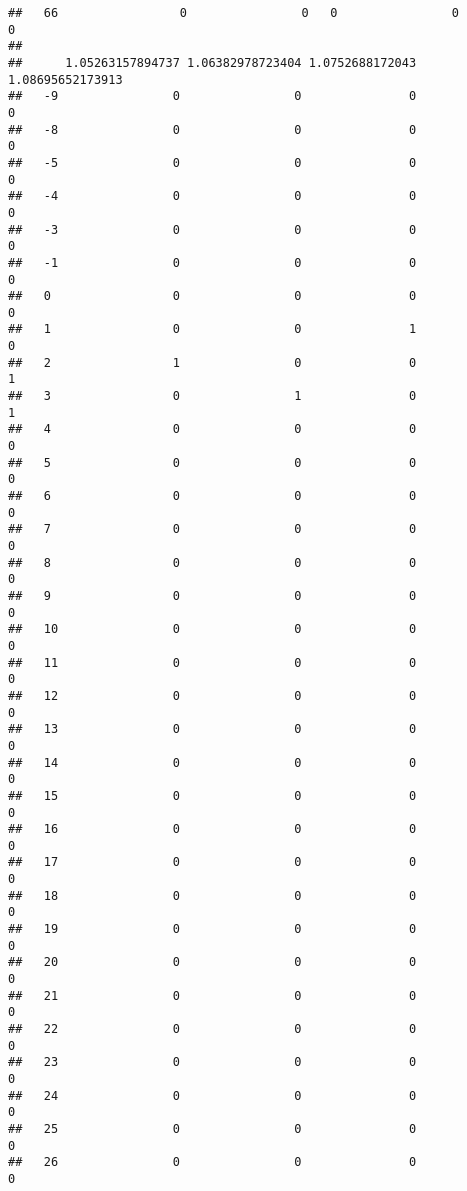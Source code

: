 \documentclass[]{article}
\begin{document}
\begin{verbatim}
##   66                 0                0   0                0                0
##     
##      1.05263157894737 1.06382978723404 1.0752688172043 1.08695652173913
##   -9                0                0               0                0
##   -8                0                0               0                0
##   -5                0                0               0                0
##   -4                0                0               0                0
##   -3                0                0               0                0
##   -1                0                0               0                0
##   0                 0                0               0                0
##   1                 0                0               1                0
##   2                 1                0               0                1
##   3                 0                1               0                1
##   4                 0                0               0                0
##   5                 0                0               0                0
##   6                 0                0               0                0
##   7                 0                0               0                0
##   8                 0                0               0                0
##   9                 0                0               0                0
##   10                0                0               0                0
##   11                0                0               0                0
##   12                0                0               0                0
##   13                0                0               0                0
##   14                0                0               0                0
##   15                0                0               0                0
##   16                0                0               0                0
##   17                0                0               0                0
##   18                0                0               0                0
##   19                0                0               0                0
##   20                0                0               0                0
##   21                0                0               0                0
##   22                0                0               0                0
##   23                0                0               0                0
##   24                0                0               0                0
##   25                0                0               0                0
##   26                0                0               0                0

\end{verbatim}
\end{document}
